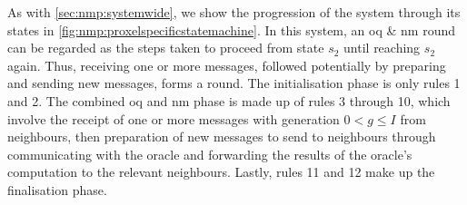As with \autoref{sec:nmp:systemwide}, we show the progression of the system through its states in \autoref{fig:nmp:proxelspecificstatemachine}.  In this system, an \gls{oq} \& \gls{nm} round can be regarded as the steps taken to proceed from state \(s_2\) until reaching \(s_2\) again.  Thus, receiving one or more messages, followed potentially by preparing and sending new messages, forms a round.  The initialisation phase is only rules 1 and 2.  The combined \gls{oq} and \gls{nm} phase is made up of rules 3 through 10, which involve the receipt of one or more messages with generation \(0 < g \leq I\) from neighbours, then preparation of new messages to send to neighbours through communicating with the oracle and forwarding the results of the oracle's computation to the relevant neighbours.  Lastly, rules 11 and 12 make up the finalisation phase.


